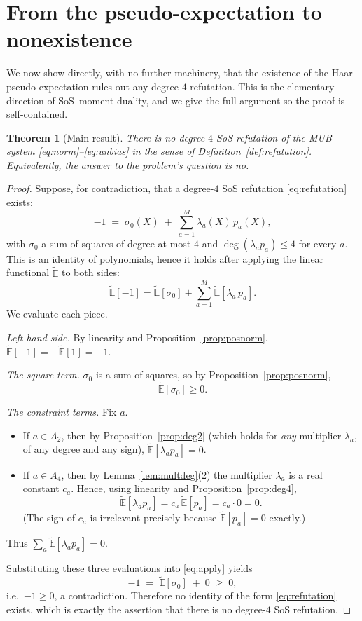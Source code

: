 \documentclass{amsart}
\newtheorem{theorem}{Theorem}
\theoremstyle{definition}
\begin{document}
\section{From the pseudo-expectation to nonexistence}\label{sec:duality}

We now show directly, with no further machinery, that the existence of the Haar
pseudo-expectation rules out any degree-$4$ refutation. This is the elementary direction of
SoS--moment duality, and we give the full argument so the proof is self-contained.

\begin{theorem}[Main result]\label{thm:main}
There is no degree-$4$ SoS refutation of the MUB system \eqref{eq:norm}--\eqref{eq:unbias} in
the sense of Definition~\ref{def:refutation}. Equivalently, the answer to the problem's
question is \emph{no}.
\end{theorem}

\begin{proof}
Suppose, for contradiction, that a degree-$4$ SoS refutation \eqref{eq:refutation} exists:
\[
-1\;=\;\sigma_0(X)\;+\;\sum_{a=1}^{M}\lambda_a(X)\,p_a(X),
\]
with $\sigma_0$ a sum of squares of degree at most $4$ and $\deg(\lambda_a p_a)\le4$ for every
$a$. This is an identity of polynomials, hence it holds after applying the linear functional
$\widetilde{\mathbb{E}}$ to both sides:
\begin{equation}\label{eq:apply}
\widetilde{\mathbb{E}}[-1]
=\widetilde{\mathbb{E}}[\sigma_0]
+\sum_{a=1}^{M}\widetilde{\mathbb{E}}[\lambda_a\,p_a].
\end{equation}
We evaluate each piece.

\smallskip
\noindent\emph{Left-hand side.} By linearity and Proposition~\ref{prop:posnorm},
$\widetilde{\mathbb{E}}[-1]=-\widetilde{\mathbb{E}}[1]=-1$.

\smallskip
\noindent\emph{The square term.} $\sigma_0$ is a sum of squares, so by
Proposition~\ref{prop:posnorm},
\[
\widetilde{\mathbb{E}}[\sigma_0]\ge 0 .
\]

\smallskip
\noindent\emph{The constraint terms.} Fix $a$.
\begin{itemize}
\item If $a\in A_2$, then by Proposition~\ref{prop:deg2} (which holds for \emph{any}
multiplier $\lambda_a$, of any degree and any sign), $\widetilde{\mathbb{E}}[\lambda_a p_a]=0$.
\item If $a\in A_4$, then by Lemma~\ref{lem:multdeg}(2) the multiplier $\lambda_a$ is a real
constant $c_a$. Hence, using linearity and Proposition~\ref{prop:deg4},
\[
\widetilde{\mathbb{E}}[\lambda_a p_a]=c_a\,\widetilde{\mathbb{E}}[p_a]=c_a\cdot 0=0 .
\]
(The sign of $c_a$ is irrelevant precisely because $\widetilde{\mathbb{E}}[p_a]=0$ exactly.)
\end{itemize}
Thus $\sum_{a}\widetilde{\mathbb{E}}[\lambda_a p_a]=0$.

\smallskip
Substituting these three evaluations into \eqref{eq:apply} yields
\[
-1\;=\;\widetilde{\mathbb{E}}[\sigma_0]\;+\;0\;\ge\;0 ,
\]
i.e.\ $-1\ge0$, a contradiction. Therefore no identity of the form \eqref{eq:refutation}
exists, which is exactly the assertion that there is no degree-$4$ SoS refutation. \qedhere
\end{proof}
\end{document}
